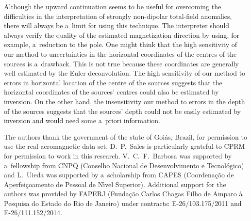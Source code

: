 \documentclass[journal abbreviation, npg]{copernicus}
\begin{document}
Although the upward continuation seems to be useful for overcoming the
difficulties in the interpretation of strongly non-dipolar total-field
anomalies, there will always be a~limit for using this technique. The
interpreter should always verify the quality of the estimated magnetization
direction by using, for example, a~reduction to the pole. One might think
that the high sensitivity of our method to uncertainties in the horizontal
coordinates of the centres of the sources is a~drawback. This is not true
because these coordinates are generally well estimated by the Euler
deconvolution. The high sensitivity of our method to errors in horizontal
location of the centre of the sources suggests that the horizontal
coordinates of the sources' centres could also be estimated by inversion. On
the other hand, the insensitivity our method to errors in the depth of the
sources suggests that the sources' depth could not be easily estimated by
inversion and would need some a~priori information.

\begin{acknowledgements}
  The authors thank the government of the state of Goi\'{a}s, Brazil,
  for permission to use the real aeromagnetic data set. D.~P.~Sales is
  particularly grateful to CPRM for permission to work in this
  research.  V.~C.~F.~Barbosa was supported by a~fellowship from CNPQ
  (Conselho Nacional de Desenvolvimento e Tecnol\'{o}gico) and
  L.~Uieda was supported by a~scholarship from CAPES
  (Coordena\c{c}\~{a}o de Aperfei\c{c}oamento de Pessoal de N\'{\i}vel
  Superior). Additional support for the authors was provided by FAPERJ
  (Funda\c{c}\~{a}o Carlos Chagas Filho de Amparo \`{a} Pesquisa do
  Estado do Rio de Janeiro) under contracts: E-26/103.175/2011 and
  E-26/111.152/2014.
\end{acknowledgements}



\end{document}
